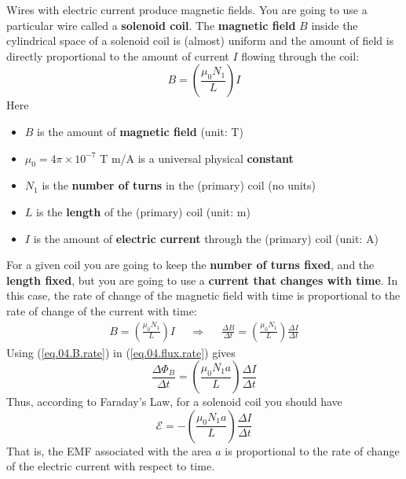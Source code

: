 Wires with electric current produce magnetic fields. You are going to use a particular wire called a \textbf{solenoid coil}. The \textbf{magnetic field} $B$ inside the cylindrical space of a solenoid coil is (almost) uniform and the amount of field is directly proportional to the amount of current $I$ flowing through the coil:
\begin{equation}
	B = \left(\frac{\mu_{0} N_{1}}{L}\right) I
	\label{eq.04.B.coil}
\end{equation}
Here
\begin{itemize}
	\item $B$ is the amount of \textbf{magnetic field} (unit: T)
	\item $\mu_{0} = 4 \pi \times 10^{-7}$ T{ }\textperiodcentered{ }m/A  is a universal physical \textbf{constant}
	\item $N_{1}$ is the \textbf{number of turns} in the (primary) coil (no units)
	\item $L$ is the \textbf{length} of the (primary) coil (unit: m)
	\item $I$ is the amount of \textbf{electric current} through the (primary) coil (unit: A)
\end{itemize}
For a given coil you are going to keep the \textbf{number of turns fixed}, and the \textbf{length fixed}, but you are going to use a \textbf{current that changes with time}. In this case, the rate of change of the magnetic field with time is proportional to the rate of change of the current with time:
\begin{align}
	B = \left(\frac{\mu_{0} N_{1}}{L}\right) I && \Longrightarrow && \frac{\Delta B}{\Delta t} = \left( \frac{\mu_{0} N_{1}}{L} \right) \frac{\Delta I}{\Delta t}
	\label{eq.04.B.rate}
\end{align}
Using (\ref{eq.04.B.rate}) in (\ref{eq.04.flux.rate}) gives
\begin{equation}
	\frac{\Delta \Phi_{B}}{\Delta t} = \left( \frac{\mu_{0} N_{1} a}{L} \right) \frac{\Delta I}{\Delta t}
\end{equation}
Thus, according to Faraday's Law, for a solenoid coil you should have
\begin{equation}
	\mathcal{E} = -\left( \frac{\mu_{0} N_{1} a}{L} \right) \frac{\Delta I}{\Delta t}
	\label{eq.04.emf.solenoid}
\end{equation}
That is, the EMF associated with the area $a$ is proportional to the rate of change of the electric current with respect to time.
%
